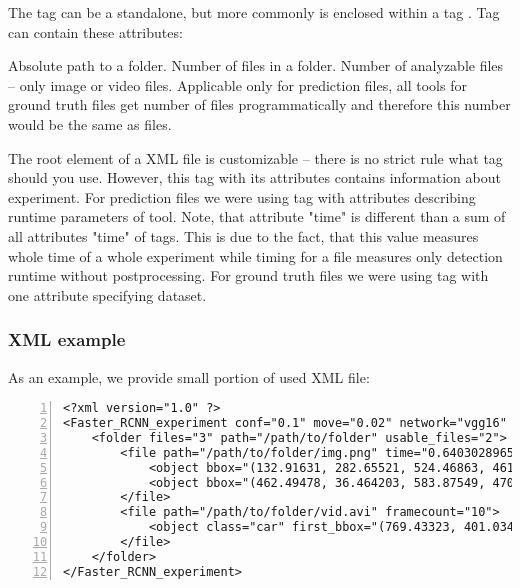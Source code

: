 The tag  can be a standalone, but more commonly is enclosed within a tag . Tag  can contain these attributes:

\begin{description}
 Absolute path to a folder.
 Number of files in a folder.
 Number of analyzable files -- only image or video files. Applicable only for prediction files, all tools for ground truth files get number of files programmatically and therefore this number would be the same as files.
\end{description}

The root element of a XML file is customizable -- there is no strict rule what tag should you use. However, this tag with its attributes contains information about experiment. For prediction files we were using tag  with attributes describing runtime parameters of \hyperref[rec]{} tool. Note, that attribute "time" is different than a sum of all attributes "time" of  tags. This is due to the fact, that this value measures whole time of a whole experiment while timing for a file measures only detection runtime without postprocessing. For ground truth files we were using tag  with one attribute specifying dataset.

\subsubsection{XML example}
As an example, we provide small portion of used XML file:

\begin{lstlisting}[numbers=left]
<?xml version="1.0" ?>
<Faster_RCNN_experiment conf="0.1" move="0.02" network="vgg16" nms="0.3" time="690.945771933" type="folder">
	<folder files="3" path="/path/to/folder" usable_files="2">
		<file path="/path/to/folder/img.png" time="0.6403028965">
			<object bbox="(132.91631, 282.65521, 524.46863, 461.32788)" class="person" prob="0.739661"/>
			<object bbox="(462.49478, 36.464203, 583.87549, 470.51736)" class="person" prob="0.20808"/>
		</file>
		<file path="/path/to/folder/vid.avi" framecount="10">
			<object class="car" first_bbox="(769.43323, 401.034, 901.0802, 477.86676)" first_frame="0" highest="0.995664" last_bbox="(767.76202, 408.27109, 899.92133, 475.68185)" last_frame="3" lowest="0.994525"/>
		</file>
	</folder>
</Faster_RCNN_experiment>
\end{lstlisting}

